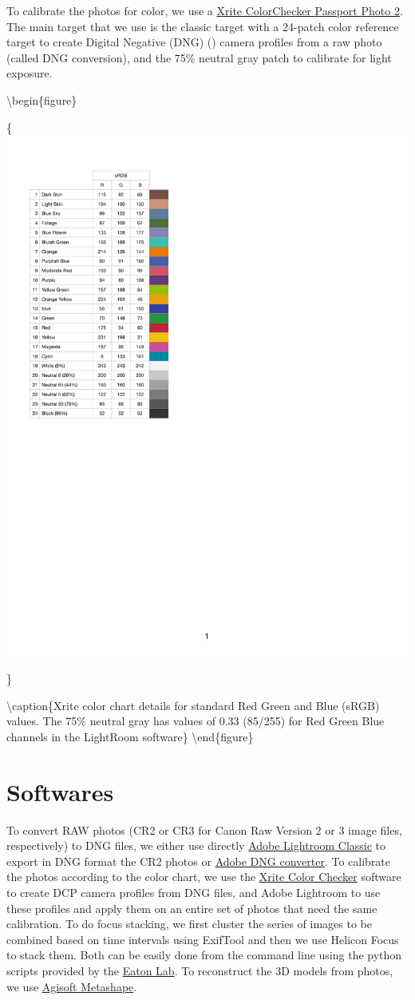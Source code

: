 \documentclass[
]{book}
\begin{document}
To calibrate the photos for color, we use a \href{https://www.xrite.com/categories/calibration-profiling/colorchecker-classic-family/colorchecker-passport-photo-2}{Xrite ColorChecker Passport
Photo
2}.
The main target that we use is the classic target with a 24-patch color
reference target to create Digital Negative (DNG) (\citet{Adobe2012DNG}) camera
profiles from a raw photo (called DNG conversion), and the 75\% neutral
gray patch to calibrate for light exposure.

\textbackslash begin\{figure\}

\{\centering \includegraphics[width=0.5\linewidth]{Figures/Color_chart_sRGB_values}

\}

\textbackslash caption\{Xrite color chart details for standard Red Green and Blue (sRGB) values. The 75\% neutral gray has values of 0.33 (85/255) for Red Green Blue channels in the LightRoom software\}\label{fig:xrite}
\textbackslash end\{figure\}

\hypertarget{softwares}{%
\section{Softwares}\label{softwares}}

To convert RAW photos (CR2 or CR3 for Canon Raw Version 2 or 3 image files, respectively) to DNG
files, we either use directly \href{https://www.adobe.com/ca_fr/products/photoshop-lightroom-classic.html}{Adobe Lightroom
Classic}
to export in DNG format the CR2 photos or \href{https://helpx.adobe.com/camera-raw/using/adobe-dng-converter.html}{Adobe DNG
converter}.
To calibrate the photos according to the color chart, we use the \href{https://xritephoto.com/ph_product_overview.aspx?ID=938\&Action=Support\&SoftwareID=2030}{Xrite
Color
Checker}
software to create DCP camera profiles from DNG files, and Adobe
Lightroom to use these profiles and apply them on an entire set of
photos that need the same calibration. To do focus stacking, we first cluster the series of images to be combined based on time intervals using ExifTool and then we use Helicon Focus to stack them. Both can be easily done from the command line using the python scripts provided by the \href{https://github.com/yuemeanshappy/photogram}{Eaton Lab}. To reconstruct the 3D models from photos, we use \href{https://www.agisoft.com/downloads/installer/}{Agisoft Metashape}.
\end{document}

